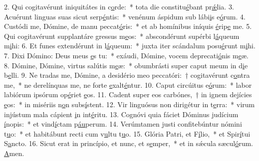 2. Qui cogitavérunt iniquitátes in c\uline{o}rde:~* tota die constitu\uline{é}bant pr\uline{ǽ}lia.
3. Acuérunt linguas suas sicut serp\uline{é}ntis:~* venénum áspidum sub lábi\uline{i}s e\uline{ó}rum.
4. Custódi me, Dómine, de manu peccat\uline{ó}ris:~* et ab homínibus iníquis \uline{é}rip\uline{e} me.
5. Qui cogitavérunt supplantáre gressus m\uline{e}os:~* abscondérunt supérbi l\uline{á}queum m\uline{i}hi:
6. Et funes extendérunt in l\uline{á}queum:~* juxta iter scándalum posu\uline{é}runt m\uline{i}hi.
7. Dixi Dómino: Deus meus \uline{e}s tu:~* exáudi, Dómine, vocem deprecati\uline{ó}nis m\uline{e}æ.
8. Dómine, Dómine, virtus salútis m\uline{e}æ:~* obumbrásti super caput meum in d\uline{i}e b\uline{e}lli.
9. Ne tradas me, Dómine, a desidério meo peccatóri:~† cogitavérunt c\uline{o}ntra me,~* ne derelínquas me, ne forte \uline{e}xalt\uline{é}ntur.
10. Caput circúitus e\uline{ó}rum:~* labor labiórum ipsórum op\uline{é}riet \uline{e}os.
11. Cadent super eos carbónes,~† in ignem dejícies \uline{e}os:~* in misériis n\uline{o}n subs\uline{í}stent.
12. Vir linguósus non dirigétur in t\uline{e}rra:~* virum injústum mala cápient \uline{i}n int\uline{é}ritu.
13. Cognóvi quia fáciet Dóminus judícium \uline{í}nopis:~* et vind\uline{í}ctam p\uline{áu}perum.
14. Verúmtamen justi confitebúntur nómini t\uline{u}o:~* et habitábunt recti cum v\uline{u}ltu t\uline{u}o.
15. Glória Patri, et F\uline{í}lio,~* et Spir\uline{í}tui S\uline{a}ncto.
16. Sicut erat in princípio, et nunc, et s\uline{e}mper,~* et in sǽcula sæcul\uline{ó}rum. \uline{A}men.

